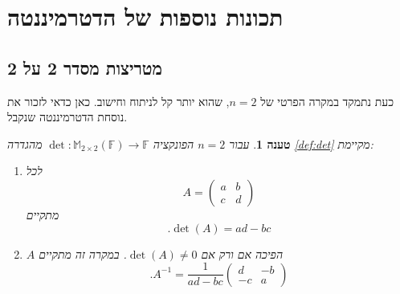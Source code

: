 \documentclass[12pt]{report}
\theoremstyle{plain}
\newtheorem{proposition}[theorem]{טענה}
\theoremstyle{definition}
\newcommand{\F}{\mathbb{F}}
\newcommand{\M}{\mathbb{M}}
\newcommand{\0}{\mathbf{0}}
\begin{document}
\section{תכונות נוספות של הדטרמיננטה}
\subsection{מטריצות מסדר 2 על 2}

כעת נתמקד במקרה הפרטי של
$n=2$,
שהוא יותר קל לניתוח וחישוב. כאן כדאי לזכור את נוסחת הדטרמיננטה שנקבל.

\begin{proposition}\label{prop:det-order-2}
עבור
$n=2$
הפונקציה
$\det:\M_{2\times 2}(\F)\to\F$
מהגדרה
\ref{def:det}
מקיימת:
\begin{enumerate}[label=\alph*.]
\item
לכל
$$
A=\begin{pmatrix}
a & b \\
c & d
\end{pmatrix}
$$
מתקיים
$$
.\det(A)=ad-bc
$$

\item 
$A$
הפיכה אם ורק אם
$\det(A)\neq 0$. 
במקרה זה מתקיים
$$
.A^{-1}=\frac{1}{ad-bc}\begin{pmatrix}
d & -b \\
-c & a
\end{pmatrix}
$$


\end{enumerate}
\end{proposition}
\end{document}
